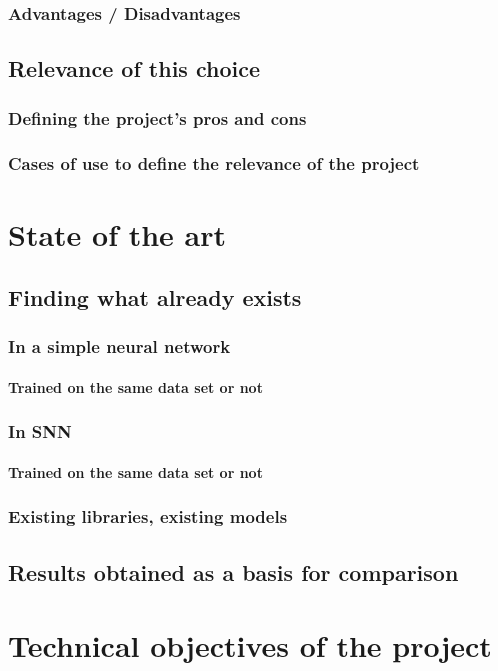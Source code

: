 \documentclass{article}
\begin{document}
\subsubsection{Advantages / Disadvantages}
\subsection{Relevance of this choice}
\subsubsection{Defining the project's pros and cons}
\subsubsection{Cases of use to define the relevance of the project}

\section{State of the art}
\subsection{Finding what already exists}
\subsubsection{In a simple neural network}
\paragraph{Trained on the same data set or not}
\subsubsection{In SNN}
\paragraph{Trained on the same data set or not}
\subsubsection{Existing libraries, existing models}
\subsection{Results obtained as a basis for comparison}

\section{Technical objectives of the project}
\end{document}
